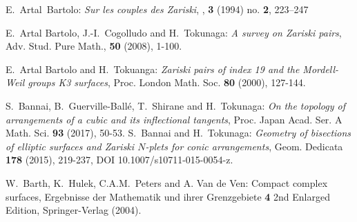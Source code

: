 \documentclass{article}
\begin{document}
     \begin{thebibliography}{99}
E.~Artal~Bartolo:
\newblock \emph{Sur les couples des {Zariski}},
, {\bf 3} (1994) no. {\bf 2}, 223--247

    E.~Artal Bartolo, J.-I.~Cogolludo and H.~Tokunaga:
   \emph{A survey on Zariski pairs}, Adv. Stud. Pure Math., \textbf{50} (2008), 1-100.
   
    E.~Artal Bartolo and H.~Tokuanga: \emph{Zariski pairs of index 19 and the Mordell-Weil groups 
 K3 surfaces}, Proc. London Math. Soc. {\bf 80} (2000), 127-144.
 
  S.~Bannai, B.~Guerville-Ball\'e, T.~Shirane and H.~Tokunaga:
  \emph{On the topology of arrangements of a cubic and its inflectional tangents}, 
  Proc. Japan Acad. Ser. A Math. Sci. {\bf 93} (2017), 50-53.
%  
%
%   
%  
%  
  S.~Bannai and H.~Tokunaga:  \emph{Geometry of  bisections of elliptic surfaces  and 
 Zariski $N$-plets for conic arrangements}, Geom.  Dedicata
 {\bf  178} (2015),  219-237,  DOI 10.1007/s10711-015-0054-z. 

 
 
 
  W.~Barth, K.~Hulek, C.A.M.~Peters and A. Van de Ven: Compact complex surfaces, 
 Ergebnisse der Mathematik und ihrer Grenzgebiete {\bf 4} 2nd Enlarged Edition, Springer-Verlag (2004).
% 


\end{thebibliography}
\end{document}
